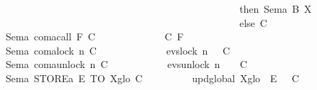 \begin{isabellebody}
\ \ \ \ \ \ \ \ \ \ \ \ \ \ \ \ \ \ \ \ \ \ \ \ \ \ \ \ \ \ \ \ \ \ \ \ \ \ \ \ \ \ \ \ \ \ \ \ \ \ \ \ \ \ then\ Sem\isactrlsub a\ B\ X\ {\isasymsigma}\ \isanewline
\ \ \ \ \ \ \ \ \ \ \ \ \ \ \ \ \ \ \ \ \ \ \ \ \ \ \ \ \ \ \ \ \ \ \ \ \ \ \ \ \ \ \ \ \ \ \ \ \ \ \ \ \ \ else\ C\ {\isasymsigma}{\isacharparenright}{\kern0pt}{\isacharparenright}{\kern0pt}{\isacartoucheclose}\isanewline
\ \ \ \ \ \ \ {\isacharbar}{\kern0pt}{\isacartoucheopen}Sem\isactrlsub a\ {\isacharparenleft}{\kern0pt}com\isactrlsub a{\isachardot}{\kern0pt}call\ F{\isacharparenright}{\kern0pt}\ C\ \ \ \ \ \ \ \ \ \ \ {\isacharequal}{\kern0pt}\ {\isacharparenleft}{\kern0pt}{\isasymlambda}\ {\isasymsigma}{\isachardot}{\kern0pt}\ C\ {\isacharparenleft}{\kern0pt}F\ {\isasymsigma}{\isacharparenright}{\kern0pt}{\isacharparenright}{\kern0pt}{\isacartoucheclose}\isanewline
\ \ \ \ \ \ \ {\isacharbar}{\kern0pt}{\isacartoucheopen}Sem\isactrlsub a\ {\isacharparenleft}{\kern0pt}com\isactrlsub a{\isachardot}{\kern0pt}lock\ n{\isacharparenright}{\kern0pt}\ C\ \ \ \ \ \ \ \ \ \ \ {\isacharequal}{\kern0pt}\ {\isacharparenleft}{\kern0pt}{\isasymlambda}\ {\isasymsigma}{\isachardot}{\kern0pt}\ evs{\isachardot}{\kern0pt}lock\ {\isacharparenleft}{\kern0pt}n\ {\isasymsigma}{\isacharparenright}{\kern0pt}\ {\isasymrightarrow}\ C\ {\isasymsigma}{\isacharparenright}{\kern0pt}{\isacartoucheclose}\isanewline
\ \ \ \ \ \ \ {\isacharbar}{\kern0pt}{\isacartoucheopen}Sem\isactrlsub a\ {\isacharparenleft}{\kern0pt}com\isactrlsub a{\isachardot}{\kern0pt}unlock\ n{\isacharparenright}{\kern0pt}\ C\ \ \ \ \ \ \ \ \ {\isacharequal}{\kern0pt}\ {\isacharparenleft}{\kern0pt}{\isasymlambda}\ {\isasymsigma}{\isachardot}{\kern0pt}\ evs{\isachardot}{\kern0pt}unlock\ {\isacharparenleft}{\kern0pt}n\ {\isasymsigma}{\isacharparenright}{\kern0pt}\ \ {\isasymrightarrow}\ C\ {\isasymsigma}{\isacharparenright}{\kern0pt}{\isacartoucheclose}\isanewline
\ \ \ \ \ \ \ {\isacharbar}{\kern0pt}{\isacartoucheopen}Sem\isactrlsub a\ {\isacharparenleft}{\kern0pt}STORE\isactrlsub a\ E\ TO\ X\isactrlsub g\isactrlsub l\isactrlsub o{\isacharparenright}{\kern0pt}\ C\ \ \ \ \ \ \ {\isacharequal}{\kern0pt}\ {\isacharparenleft}{\kern0pt}{\isasymlambda}\ {\isasymsigma}{\isachardot}{\kern0pt}\ upd\isactrlsub g\isactrlsub l\isactrlsub o\isactrlsub b\isactrlsub a\isactrlsub l\ {\isacharparenleft}{\kern0pt}X\isactrlsub g\isactrlsub l\isactrlsub o\ {\isasymsigma}{\isacharparenright}{\kern0pt}\ {\isacharparenleft}{\kern0pt}E\ {\isasymsigma}{\isacharparenright}{\kern0pt}\ {\isasymrightarrow}\ C\ {\isasymsigma}{\isacharparenright}{\kern0pt}{\isacartoucheclose}\isanewline

\end{isabellebody}
